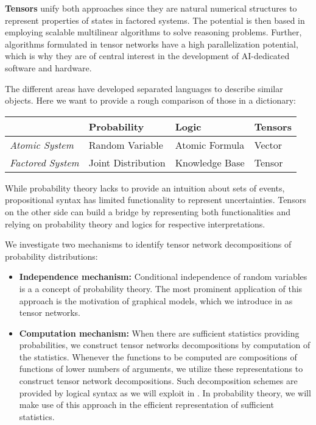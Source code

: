 \textbf{Tensors} unify both approaches since they are natural numerical structures to represent properties of states in factored systems.
The potential is then based in employing scalable multilinear algorithms to solve reasoning problems.
Further, algorithms formulated in tensor networks have a high parallelization potential, which is why they are of central interest in the development of AI-dedicated software and hardware.

The different areas have developed separated languages to describe similar objects.
Here we want to provide a rough comparison of those in a dictionary:

\begin{tabular}{|p{\fourcolumnwidth}|p{\fourcolumnwidth}|p{\fourcolumnwidth}|p{\fourcolumnwidth}|} %
    \hline
    & \textbf{Probability} & \textbf{Logic} & \textbf{Tensors}   \\
    \hline
    \textit{Atomic System}        & Random Variable             & Atomic Formula               & Vector             \\
    \textit{Factored System}      & Joint Distribution          & Knowledge Base               & Tensor             \\
    \hline
\end{tabular}

While probability theory lacks to provide an intuition about sets of events, propositional syntax has limited functionality to represent uncertainties.
Tensors on the other side can build a bridge by representing both functionalities and relying on probability theory and logics for respective interpretations.


We investigate two mechanisms to identify tensor network decompositions of probability distributions:
\begin{itemize}
    \item \textbf{Independence mechanism:} Conditional independence of random variables is a a concept of probability theory.
       The most prominent application of this approach is the motivation of graphical models, which we introduce in  as tensor networks.
    \item \textbf{Computation mechanism:} When there are sufficient statistics providing probabilities, we construct tensor networks decompositions by computation of the statistics.
        Whenever the functions to be computed are compositions of functions of lower numbers of arguments, we utilize these representations to construct tensor network decompositions.
        Such decomposition schemes are provided by logical syntax as we will exploit in .
        In probability theory, we will make use of this approach in the efficient representation of sufficient statistics.
\end{itemize}
